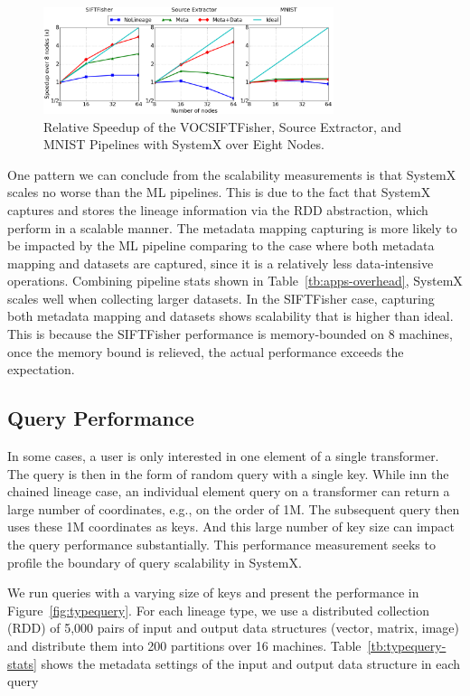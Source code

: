 \documentclass{sig-alternate}
\begin{document}
\begin{figure}[t]
\begin{center}
    \includegraphics[width=85mm]{pictures/Scalability}
\caption {Relative Speedup of the VOCSIFTFisher, Source Extractor, and MNIST Pipelines with SystemX over Eight Nodes.
    \label{fig:scalability}
}
\end{center}
\end{figure}

One pattern we can conclude from the scalability measurements is that SystemX scales no worse than the ML pipelines.
This is due to the fact that SystemX captures and stores the lineage information via the RDD abstraction, which perform
in a scalable manner. 
The metadata mapping capturing is more likely to be impacted by the ML pipeline comparing to the case where both metadata
mapping and datasets are captured, since it is a relatively less data-intensive operations.
Combining pipeline stats shown in Table~\ref{tb:apps-overhead}, SystemX scales  well when collecting larger datasets.
In the SIFTFisher case, capturing both metadata mapping and datasets shows scalability that is higher than ideal.
This is because the SIFTFisher performance is memory-bounded on 8 machines, once the memory bound is relieved, the actual performance
exceeds the expectation.

\subsection{Query Performance}
In some cases, a user is only interested in one element of a single transformer.
The query is then in the form of random query with a single key.
While inn the chained lineage case, an individual element query on a transformer can return a large number of coordinates, e.g., on the order of 1M. 
The subsequent query then uses these 1M coordinates as keys.
And this large number of key size can impact the query performance substantially.  
This performance measurement seeks to profile the boundary of query scalability in SystemX. 

We run queries with a varying size of keys
and present the performance in Figure~\ref{fig:typequery}. For each lineage type, we use a distributed collection (RDD) of 5,000 pairs of 
input and output data structures (vector, matrix, image) and distribute them into 200 partitions over 16 machines.
Table~\ref{tb:typequery-stats} shows the metadata settings of the input and output data structure in each query
\end{document}
